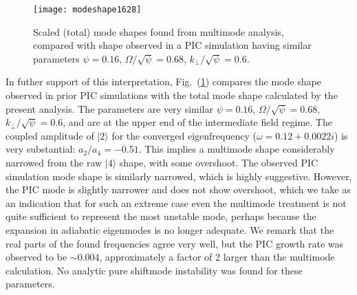 \documentclass{jpp}
\def\ket#1{|#1\rangle}
\begin{document}
\begin{figure}
  \center  \texttt{[image: modeshape1628]}
  \caption{Scaled (total) mode shapes found from multimode analysis,
    compared with shape observed in a PIC simulation having similar
    parameters $\psi=0.16$, $\Omega/\sqrt{\psi}=0.68$,
$k_\perp/\sqrt{\psi}=0.6$.\label{piccomp}}
\end{figure}
In futher support of this interpretation, Fig.\ (\ref{piccomp})
compares the mode shape observed in prior PIC simulations
\citep{Hutchinson2019} with the total mode shape calculated by the
present analysis. The parameters are very similar $\psi=0.16$,
$\Omega/\sqrt{\psi}=0.68$, $k_\perp/\sqrt{\psi}=0.6$, and are at the
upper end of the intermediate field regime. The coupled amplitude of
$\ket{2}$ for the converged eigenfrequency ($\omega=0.12+0.0022i$) is
very substantial: $a_2/a_4=-0.51$. This implies a multimode shape
considerably narrowed from the raw $\ket{4}$ shape, with some
overshoot. The observed PIC simulation mode shape is similarly
narrowed, which is highly suggestive. However, the PIC mode is
slightly narrower and does not show overshoot, which we take as an
indication that for such an extreme case even the multimode treatment
is not quite sufficient to represent the most unstable mode, perhaps
because the expansion in adiabatic eigenmodes is no longer
adequate. We remark that the real parts of the found frequencies agree
very well, but the PIC growth rate was observed to be $\sim 0.004$,
approximately a factor of 2 larger than the multimode calculation. No
analytic pure shiftmode instability was found for these parameters.
\end{document}
